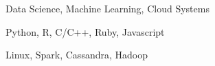 
\medskip


Data Science,
Machine Learning,
Cloud Systems

\bigskip
{}

Python, R, C/C++, Ruby, Javascript

\bigskip
{}

Linux, Spark, Cassandra, Hadoop

